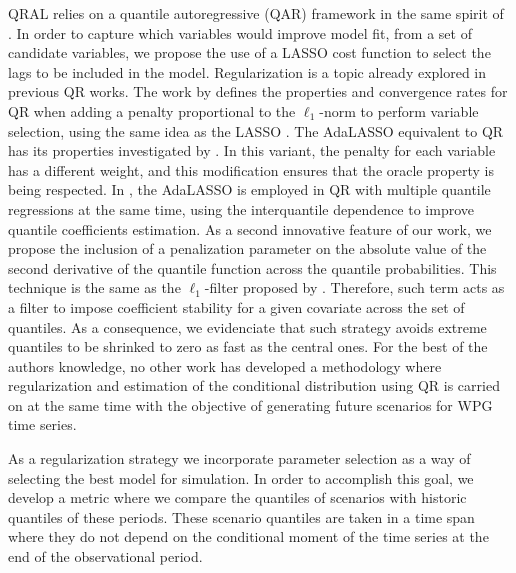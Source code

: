 QRAL relies on a quantile autoregressive (QAR) framework in the same spirit of \cite{koenker1978regression,koenker_quantile_2006,koenker2005quantile}. In order to capture which variables would improve model fit, from a set of candidate variables, we propose the use of a LASSO cost function to select the lags to be included in the model.
Regularization is a topic already explored in previous QR works.
The work by \cite{belloni_l1-penalized_2009} defines the properties and convergence rates for QR when adding a penalty proportional to the $\ell_1$-norm to perform variable selection, using the same idea as the LASSO \cite{tibshirani1996regression}. The AdaLASSO equivalent to QR has its properties investigated by \cite{ciuperca_adaptive_2016}. In this variant, the penalty for each variable has a different weight, and this modification ensures that the oracle property is being respected. %
In \cite{zou_regularized_2008,jiang_interquantile_2014}, the AdaLASSO is employed in QR with multiple quantile regressions at the same time, using the interquantile dependence to improve  quantile coefficients estimation.
As a second innovative feature of our work, we propose the inclusion of a penalization parameter on the absolute value of the second derivative of the quantile function across the quantile probabilities. 
This technique is the same as the $\ell_1$-filter proposed by \cite{boyd2011distributed}. Therefore, such term acts as a filter to impose coefficient stability for a given covariate across the set of quantiles. As a consequence, we evidenciate that such strategy avoids extreme quantiles to be shrinked to zero as fast as the central ones.
For the best of the authors knowledge, no other work has developed a methodology where regularization and estimation of the conditional distribution using QR is carried on at the same time with the objective of generating future scenarios for WPG time series.

As a regularization strategy we incorporate parameter selection as a way of selecting the best model for simulation. In order to accomplish this goal, we develop a metric where we compare the quantiles of scenarios with historic quantiles of these periods. These scenario quantiles are taken in a time span where they do not depend on the conditional moment of the time series at the end of the observational period. 
 

